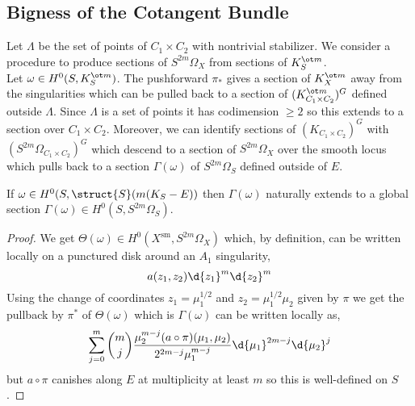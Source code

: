 \documentclass[12pt]{article}
\begin{document}
\subsection{Bigness of the Cotangent Bundle}

\renewcommand{\sm}{\mathrm{sm}}

Let $\Lambda$ be the set of points of $C_1 \times C_2$ with nontrivial stabilizer. We consider a procedure to produce sections of $S^{2m} \Omega_X$ from sections of $K_S^{\ot m}$. 
\bigskip\\
Let $\omega \in H^0(S, K_S^{\ot m})$. The pushforward $\pi_*$ gives a section of $K_X^{\ot m}$ away from the singularities which can be pulled back to a section of $(K_{C_1 \times C_2}^{\ot m})^G$ defined outside $\Lambda$. Since $\Lambda$ is a set of points it has codimension $\ge 2$ so this extends to a section over $C_1 \times C_2$. Moreover, we can identify sections of $(K_{C_1 \times C_2})^G$ with $(S^{2m} \Omega_{C_1 \times C_2})^G$ which descend to a section of $S^{2m} \Omega_X$ over the smooth locus which pulls back to a section $\Gamma(\omega)$ of $S^{2m} \Omega_S$ defined outside of $E$. 
\begin{center}
\end{center} 

\begin{prop}
If $\omega \in H^0(S, \struct{S}(m(K_S - E))$ then $\Gamma(\omega)$ naturally extends to a global section $\Gamma(\omega) \in H^0(S, S^{2m} \Omega_S)$.
\end{prop}

\begin{proof}
We get $\Theta(\omega) \in H^0(X^{\sm}, S^{2m} \Omega_X)$ which, by definition, can be written locally on a punctured disk around an $A_1$ singularity,
\[ a(z_1, z_2) \d{z_1}^m \d{z_2}^m \]
Using the change of coordinates $z_1 = \mu_1^{1/2}$ and $z_2 = \mu_1^{1/2} \mu_2$ given by $\pi$ we get the pullback by $\pi^*$ of $\Theta(\omega)$ which is $\Gamma(\omega)$ can be written locally as,
\[ \sum_{j = 0}^m {m \choose j} \frac{\mu_2^{m-j} (a \circ \pi)(\mu_1, \mu_2)}{2^{2m - j} \mu_1^{m-j}} \d{\mu_1}^{2m-j} \d{\mu_2}^j \]
but $a \circ \pi$ canishes along $E$ at multiplicity at least $m$ so this is well-defined on $S$. 
\end{proof}
\end{document}
